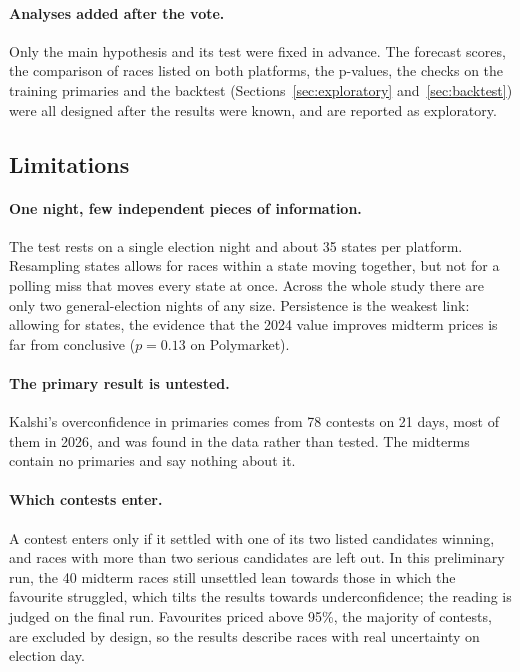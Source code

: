 \paragraph{Analyses added after the vote.} Only the main hypothesis and its test were fixed in advance. The forecast
scores, the comparison of races listed on both platforms, the p-values, the checks on the training primaries and the
backtest (Sections~\ref{sec:exploratory} and~\ref{sec:backtest}) were all designed after the results were known, and
are reported as exploratory.

\subsection{Limitations}

\paragraph{One night, few independent pieces of information.} The test rests on a single election night and about 35
states per platform. Resampling states allows for races within a state moving together, but not for a polling miss that
moves every state at once. Across the whole study there are only two general-election nights of any size. Persistence
is the weakest link: allowing for states, the evidence that the 2024 value improves midterm prices is far from
conclusive ($p = 0.13$ on Polymarket).

\paragraph{The primary result is untested.} Kalshi's overconfidence in primaries comes from 78 contests on 21 days,
most of them in 2026, and was found in the data rather than tested. The midterms contain no primaries and say nothing
about it.

\paragraph{Which contests enter.} A contest enters only if it settled with one of its two listed candidates winning, and
races with more than two serious candidates are left out. In this preliminary run, the 40 midterm races still unsettled
lean towards those in which the favourite struggled, which tilts the results towards underconfidence; the reading is
judged on the final run. Favourites priced above 95\%, the majority of contests, are excluded by design, so the results
describe races with real uncertainty on election day.

